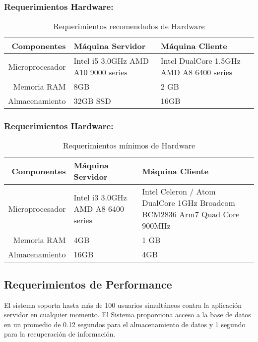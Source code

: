 \documentclass[a4paper,11pt, spanish]{report}
\begin{document}
{{{{{{        \subsubsection{Requerimientos Hardware:}
        {\renewcommand{\arraystretch}{1.7}%
        \noindent\begin{table}[H]
        \noindent\begin{tabularx}{\textwidth}{r|X|X}
          \textbf{{\large Componentes}} & \textbf{{\large Máquina Servidor}} & \textbf{{\large Máquina Cliente}} \\
          \hline
         Microprocesador & Intel i5 3.0GHz \newline AMD A10 9000 series & Intel DualCore 1.5GHz \newline AMD A8 6400 series\\ \hline
         Memoria RAM & 8GB & 2 GB \\ \hline
         Almacenamiento & 32GB SSD & 16GB \\ \hline
        \end{tabularx}
        \caption{Requerimientos recomendados de Hardware}
        \end{table}
        \subsubsection{Requerimientos Hardware:}
        {\renewcommand{\arraystretch}{1.7}%
        \noindent\begin{table}[H]
        \noindent\begin{tabularx}{\textwidth}{r|X|X}
          \textbf{{\large Componentes}} & \textbf{{\large Máquina Servidor}} & \textbf{{\large Máquina Cliente}} \\
          \hline
         Microprocesador & Intel i3 3.0GHz \newline AMD A8 6400 series & Intel Celeron / Atom DualCore 1GHz \newline Broadcom BCM2836 Arm7 Quad Core 900MHz\\ \hline
         Memoria RAM & 4GB & 1 GB \\ \hline
         Almacenamiento & 16GB & 4GB \\ \hline
        \end{tabularx}
        \caption{Requerimientos mínimos de Hardware}
        \end{table}
        
        \subsection{Requerimientos de Performance}
             El sistema soporta hasta más de 100 usuarios simultáneos contra la aplicación servidor en cualquier momento. El Sistema proporciona acceso a la base de datos en un promedio de 0.12 segundos para el almacenamiento de datos y 1 segundo para la recuperación de información.
}}}}}}}}
\end{document}
